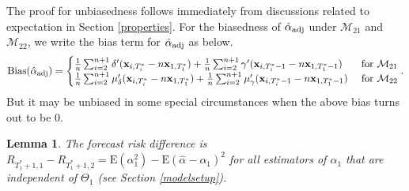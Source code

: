 \documentclass[11pt]{article}
\def\mbf#1{\mathbf{#1}} %
\def\mrm#1{\mathrm{#1}} %
\def\mc#1{\mathcal{#1}} %
\def\E#1{\mathrm{E}(#1)} %
\newtheorem{lem}{Lemma}
\theoremstyle{definition}
\newenvironment{proof-of-proposition}[1][{}]{\noindent{\bf
    Proof of Proposition {#1}}
  \hspace*{.5em}}{\qed\bigskip\\}
\begin{document}
\begin{proof-of-proposition}[\ref{unbiased}] The proof for unbiasedness follows immediately from discussions related to expectation in Section \ref{properties}. For the biasedness of  $\hat{\alpha}_{\rm adj}$ under $\mc{M}_{21}$ and $\mc{M}_{22}$, we write the bias term for $\hat{\alpha}_{\rm adj}$ as below.
\begin{align*}
  \mrm{Bias}(\hat{\alpha}_{\rm adj}) = 
  \begin{cases}
       \frac{1}{n} \sum_{i=2}^{n+1} \delta'(\mbf{x}_{i, T_i^*}-n\mbf{x}_{1, T_1^*}) +  \frac{1}{n} \sum_{i=2}^{n+1} \gamma'(\mbf{x}_{i, T_i^*-1}-n\mbf{x}_{1, T_1^*-1}) & \text{ for } \mc{M}_{21}\\
    \frac{1}{n} \sum_{i=2}^{n+1} \mu_{\delta}'(\mbf{x}_{i, T_i^*}-n\mbf{x}_{1, T_1^*}) +  \frac{1}{n} \sum_{i=2}^{n+1} \mu_{\gamma}'(\mbf{x}_{i, T_i^*-1}-n\mbf{x}_{1, T_1^*-1}) & \text{ for }\mc{M}_{22}
  \end{cases}.
\end{align*}
But it may be unbiased in some special circumstances when the above bias turns out to be 0. \end{proof-of-proposition}

\begin{lem}
  \label{risklemma} The forecast risk difference is $R_{T_1^*+1,1}-R_{T_1^*+1,2}=\E{\alpha_1^2}-\E{\hat{\alpha}-\alpha_1}^2$ for all estimators of $\alpha_1$ that are independent of $\Theta_1$ (see Section \ref{modelsetup}).
\end{lem}
\end{document}
